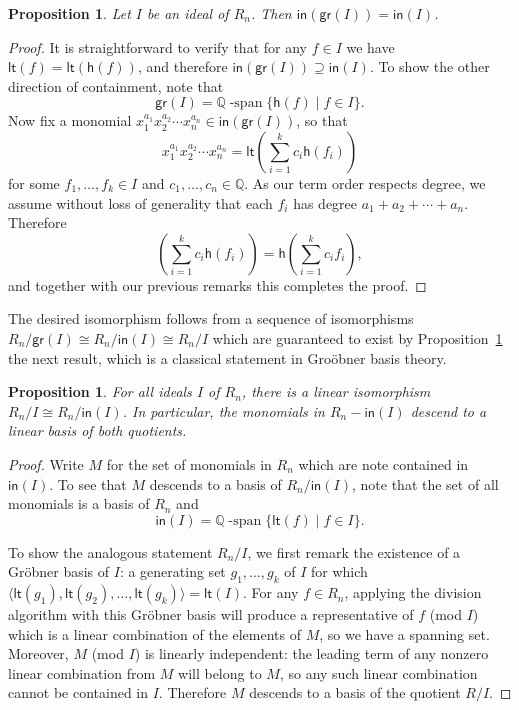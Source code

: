 \documentclass[12pt]{amsart}
\newtheorem{prop}[equation]{Proposition}
\theoremstyle{definition}
\theoremstyle{remark}
\numberwithin{equation}{section}
\newcommand{\QQ}{\mathbb{Q}}
\newcommand{\spanning}{\operatorname{-span}}
\renewcommand{\setminus}{-}
\begin{document}
\begin{prop}
\label{prop:grin}
Let $I$ be an ideal of $R_{n}$.  Then $\mathsf{in}(\mathsf{gr}(I)) = \mathsf{in}(I)$.
\end{prop}
\begin{proof}
It is straightforward to verify that for any $f \in I$ we have $\mathsf{lt}(f) = \mathsf{lt}(\mathsf{h}(f))$, and therefore $\mathsf{in}(\mathsf{gr}(I)) \supseteq \mathsf{in}(I)$. To show the other direction of containment, note that
\[
\mathsf{gr}(I) = \QQ\spanning\{\mathsf{h}(f) \;|\; f \in I\}.
\]
Now fix a monomial $x_{1}^{a_{1}} x_{2}^{a_{2}}\cdots x_{n}^{a_{n}} \in \mathsf{in}(\mathsf{gr}(I))$, so that
\[
x_{1}^{a_{1}}  x_{2}^{a_{2}} \cdots x_{n}^{a_{n}} = \mathsf{lt}\left(\sum_{i =1}^{k} c_{i} \mathsf{h}(f_{i}) \right)
\]
for some $f_{1}, \ldots, f_{k} \in I$ and $c_{1}, \ldots, c_{n} \in \QQ$.  As our term order respects degree, we assume without loss of generality that each $f_{i}$ has degree $a_{1} + a_{2} + \cdots + a_{n}$.  Therefore 
\[
\left(\sum_{i =1}^{k} c_{i} \mathsf{h}(f_{i}) \right) = \mathsf{h}\left(\sum_{i =1}^{k} c_{i} f_{i} \right),
\]
and together with our previous remarks this completes the proof.
\end{proof}

The desired isomorphism follows from a sequence of isomorphisms $R_{n}/\mathsf{gr}(I) \cong R_{n}/\mathsf{in}(I) \cong R_{n}/I$ which are guaranteed to exist by Proposition~\ref{prop:grin} the next result, which is a classical statement in Gro\"{o}bner basis theory.  

\begin{prop}
\label{prop:Gbasis}
For all ideals $I$ of $R_{n}$, there is a linear isomorphism $R_{n}/I \cong R_{n} / \mathsf{in}(I)$.  In particular, the monomials in $R_{n} \setminus \mathsf{in}(I)$ descend to a linear basis of both quotients.
\end{prop}
\begin{proof}
Write $M$ for the set of monomials in $R_{n}$ which are note contained in $\mathsf{in}(I)$.  To see that $M$ descends to a basis of $R_{n} / \mathsf{in}(I)$, note that the set of all monomials is a basis of $R_{n}$ and 
\[
\mathsf{in}(I) = \QQ\spanning\{\mathsf{lt}(f) \;|\; f \in I\}.
\]

To show the analogous statement $R_{n}/I$, we first remark the existence of a Gr\"{o}bner basis of $I$: a generating set $g_{1}, \ldots, g_{k}$ of $I$ for which $\langle \mathsf{lt}(g_{1}), \mathsf{lt}(g_{2}), \ldots, \mathsf{lt}(g_{k}) \rangle = \mathsf{lt}(I)$.
For any $f \in R_{n}$, applying the division algorithm with this Gr\"{o}bner basis will produce a representative of $f$ (mod $I$) which is a linear combination of the elements of $M$, so we have a spanning set.  
Moreover, $M$ (mod $I$) is linearly independent: the leading term of any nonzero linear combination from $M$ will belong to $M$, so any such linear combination cannot be contained in $I$.  
Therefore $M$ descends to a basis of the quotient $R/I$.
\end{proof}
\end{document}
